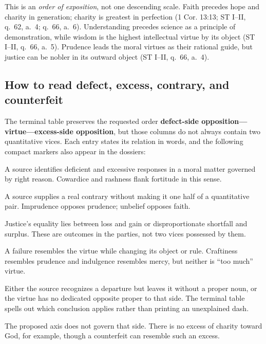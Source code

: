 {This is an \emph{order of exposition}, not one descending scale. Faith precedes hope and charity in generation; charity is greatest in perfection (1 Cor. 13:13; ST I--II, q.~62, a.~4; q.~66, a.~6). Understanding precedes science as a principle of demonstration, while wisdom is the highest intellectual virtue by its object (ST I--II, q.~66, a.~5). Prudence leads the moral virtues as their rational guide, but justice can be nobler in its outward object (ST I--II, q.~66, a.~4).

\subsection{How to read defect, excess, contrary, and counterfeit}

The terminal table preserves the requested order \textbf{defect-side opposition---virtue---excess-side opposition}, but those columns do not always contain two quantitative vices. Each entry states its relation in words, and the following compact markers also appear in the dossiers:

\begin{description}[leftmargin=2.4em,style=nextline,itemsep=0.3em]
  \item[\oppositioncode{M}: mean flank] A source identifies deficient and excessive responses in a moral matter governed by right reason. Cowardice and rashness flank fortitude in this sense.
  \item[\oppositioncode{K}: named contrary] A source supplies a real contrary without making it one half of a quantitative pair. Imprudence opposes prudence; unbelief opposes faith.
  \item[\oppositioncode{O}: objective outcome] Justice's equality lies between loss and gain or disproportionate shortfall and surplus. These are outcomes in the parties, not two vices possessed by them.
  \item[\oppositioncode{X}: counterfeit or corruption] A failure resembles the virtue while changing its object or rule. Craftiness resembles prudence and indulgence resembles mercy, but neither is “too much” virtue.
  \item[\oppositioncode{U}: unnamed or unpaired] Either the source recognizes a departure but leaves it without a proper noun, or the virtue has no dedicated opposite proper to that side. The terminal table spells out which conclusion applies rather than printing an unexplained dash.
  \item[\oppositioncode{NA}: inapplicable] The proposed axis does not govern that side. There is no excess of charity toward God, for example, though a counterfeit can resemble such an excess.
\end{description}

}
